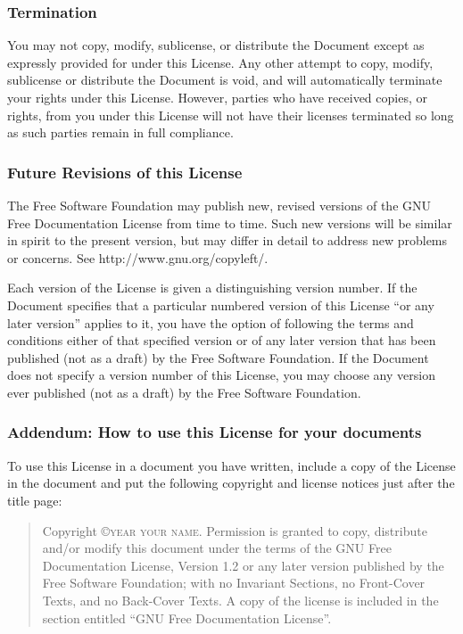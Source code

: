\subsubsection{Termination}

You may not copy, modify, sublicense, or distribute the Document except
as expressly provided for under this License.  Any other attempt to
copy, modify, sublicense or distribute the Document is void, and will
automatically terminate your rights under this License.  However,
parties who have received copies, or rights, from you under this
License will not have their licenses terminated so long as such
parties remain in full compliance.


\subsubsection{Future Revisions of this License}

The Free Software Foundation may publish new, revised versions
of the GNU Free Documentation License from time to time.  Such new
versions will be similar in spirit to the present version, but may
differ in detail to address new problems or concerns.  See
http://www.gnu.org/copyleft/.

Each version of the License is given a distinguishing version number.
If the Document specifies that a particular numbered version of this
License ``or any later version'' applies to it, you have the option of
following the terms and conditions either of that specified version or
of any later version that has been published (not as a draft) by the
Free Software Foundation.  If the Document does not specify a version
number of this License, you may choose any version ever published (not
as a draft) by the Free Software Foundation.


\subsubsection{Addendum: How to use this License for your documents}

To use this License in a document you have written, include a copy of
the License in the document and put the following copyright and
license notices just after the title page:

\bigskip
\begin{quote}
    Copyright \copyright \textsc{year your name}.
    Permission is granted to copy, distribute and/or modify this document
    under the terms of the GNU Free Documentation License, Version 1.2
    or any later version published by the Free Software Foundation;
    with no Invariant Sections, no Front-Cover Texts, and no Back-Cover Texts.
    A copy of the license is included in the section entitled ``GNU
    Free Documentation License''.
\end{quote}
\bigskip
    
